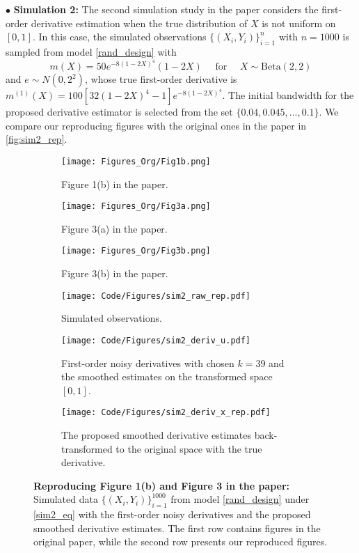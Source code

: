 \documentclass{uwstat572}
\theoremstyle{definition}
\theoremstyle{theorem}
\begin{document}
$\bullet$ {\bf Simulation 2:} The second simulation study in the paper \citep{liu2020smoothed} considers the first-order derivative estimation when the true distribution of $X$ is not uniform on $[0,1]$. In this case, the simulated observations $\{(X_i,Y_i)\}_{i=1}^n$ with $n=1000$ is sampled from model \eqref{rand_design} with
\begin{equation}
\label{sim2_eq}
m(X) = 50e^{-8(1-2X)^4} (1-2X)\quad \text{ for } \quad X\sim \mathrm{Beta}(2,2)
\end{equation}
and $e\sim N(0,2^2)$, whose true first-order derivative is $m^{(1)}(X) = 100\left[32(1-2X)^4 -1\right] e^{-8(1-2X)^4}$. The initial bandwidth for the proposed derivative estimator is selected from the set $\{0.04, 0.045,...,0.1\}$. We compare our reproducing figures with the original ones in the paper in \autoref{fig:sim2_rep}.

\begin{figure}[t]
	\captionsetup[subfigure]{justification=centering}
	\begin{subfigure}[t]{0.32\linewidth}
		\centering
		\texttt{[image: Figures\_Org/Fig1b.png]}
		\caption{Figure 1(b) in the paper.}
	\end{subfigure}
	\hfil
	\begin{subfigure}[t]{0.32\linewidth}
		\centering
		\texttt{[image: Figures\_Org/Fig3a.png]}
		\caption{Figure 3(a) in the paper.}
	\end{subfigure}
	\hfil
	\begin{subfigure}[t]{0.32\linewidth}
		\centering
		\texttt{[image: Figures\_Org/Fig3b.png]}
		\caption{Figure 3(b) in the paper.}
	\end{subfigure}
	\begin{subfigure}[t]{0.32\linewidth}
		\centering
		\texttt{[image: Code/Figures/sim2\_raw\_rep.pdf]}
		\caption{Simulated observations.}
	\end{subfigure}
	\hfil
	\begin{subfigure}[t]{0.32\linewidth}
		\centering
		\texttt{[image: Code/Figures/sim2\_deriv\_u.pdf]}
		\caption{First-order noisy derivatives with chosen $k=39$ and the smoothed estimates on the transformed space $[0,1]$.}
	\end{subfigure}
	\hfil
	\begin{subfigure}[t]{0.32\linewidth}
		\centering
		\texttt{[image: Code/Figures/sim2\_deriv\_x\_rep.pdf]}
		\caption{The proposed smoothed derivative estimates back-transformed to the original space with the true derivative.}
	\end{subfigure}
	\caption{{\bf Reproducing Figure 1(b) and Figure 3 in the paper:} Simulated data $\{(X_i,Y_i)\}_{i=1}^{1000}$ from model \eqref{rand_design} under \eqref{sim2_eq} with the first-order noisy derivatives and the proposed smoothed derivative estimates. The first row contains figures in the original paper, while the second row presents our reproduced figures.}
	\label{fig:sim2_rep}
\end{figure}
\end{document}

